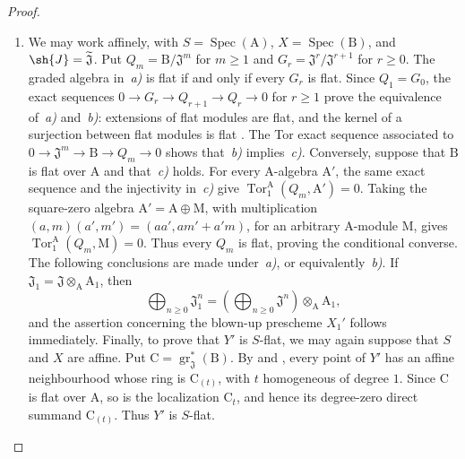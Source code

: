 \begin{proof}
\begin{enumerate}[label=(\roman*)]
  \item We may work affinely, with $S=\operatorname{Spec}(\mathrm{A})$, $X=\operatorname{Spec}(\mathrm{B})$, and $\sh{J}=\widetilde{\mathfrak{J}}$. Put $Q_m=\mathrm{B}/\mathfrak{J}^m$ for $m\geq1$ and $G_r=\mathfrak{J}^r/\mathfrak{J}^{r+1}$ for $r\geq0$. The graded algebra in~\emph{a)} is flat if and only if every $G_r$ is flat. Since $Q_1=G_0$, the exact sequences $0\to G_r\to Q_{r+1}\to Q_r\to0$ for $r\geq1$ prove the equivalence of~\emph{a)} and~\emph{b)}: extensions of flat modules are flat, and the kernel of a surjection between flat modules is flat . The Tor exact sequence associated to $0\to\mathfrak{J}^m\to\mathrm{B}\to Q_m\to0$ shows that~\emph{b)} implies~\emph{c)}. Conversely, suppose that $\mathrm{B}$ is flat over $\mathrm{A}$ and that~\emph{c)} holds. For every $\mathrm{A}$-algebra $\mathrm{A}'$, the same exact sequence and the injectivity in~\emph{c)} give $\operatorname{Tor}_1^{\mathrm{A}}(Q_m,\mathrm{A}')=0$. Taking the square-zero algebra $\mathrm{A}'=\mathrm{A}\oplus\mathrm{M}$, with multiplication $(a,m)(a',m')=(aa',am'+a'm)$, for an arbitrary $\mathrm{A}$-module $\mathrm{M}$, gives $\operatorname{Tor}_1^{\mathrm{A}}(Q_m,\mathrm{M})=0$. Thus every $Q_m$ is flat, proving the conditional converse. The following conclusions are made under~\emph{a)}, or equivalently~\emph{b)}.
If $\mathfrak{J}_1=\mathfrak{J}\otimes_{\mathrm{A}}\mathrm{A}_1$, then
\[
  \bigoplus_{n\geq0}\mathfrak{J}_1^n=\left(\bigoplus_{n\geq0}\mathfrak{J}^n\right)\otimes_{\mathrm{A}}\mathrm{A}_1,
\]
and the assertion concerning the blown-up prescheme $X_1'$ follows immediately.
Finally, to prove that $Y'$ is $S$-flat, we may again suppose that $S$ and $X$ are affine. Put $\mathrm{C}=\operatorname{gr}_\mathfrak{J}^*(\mathrm{B})$. By  and , every point of $Y'$ has an affine neighbourhood whose ring is $\mathrm{C}_{(t)}$, with $t$ homogeneous of degree $1$. Since $\mathrm{C}$ is flat over $\mathrm{A}$, so is the localization $\mathrm{C}_t$, and hence its degree-zero direct summand $\mathrm{C}_{(t)}$. Thus $Y'$ is $S$-flat.


\end{enumerate}
\end{proof}
